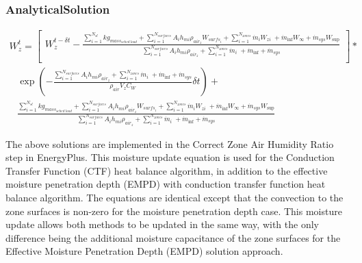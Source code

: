 \subsubsection{AnalyticalSolution}\label{analyticalsolution-1-001}

\begin{equation}
\begin{array}{l}W_z^t = \left[ \begin{array}{l}W_z^{t - \delta t} - \frac{{\sum\limits_{i = 1}^{{N_{sl}}} {k{g_{mas{s_{sched\;load}}}}}  + \sum\limits_{i = 1}^{{N_{surfaces}}} {{A_i}{h_{mi}}} {\rho_{ai{r_z}}}{W_{surf{s_i}}} + \sum\limits_{i = 1}^{{N_{zones}}} {{{\dot m}_i}} {W_{zi}}\; + {{\dot m}_{\inf }}{W_\infty } + {{\dot m}_{sys}}{W_{\sup }}}}{{\sum\limits_{i = 1}^{{N_{surfaces}}} {{A_i}{h_{mi}}} {\rho_{ai{r_z}}} + \sum\limits_{i = 1}^{{N_{zones}}} {{{\dot m}_i}} \; + {{\dot m}_{\inf }} + {{\dot m}_{sys}}}}\\\end{array} \right]*\\\;\;\;\exp \left( { - \frac{{\sum\limits_{i = 1}^{{N_{surfaces}}} {{A_i}{h_{mi}}} {\rho_{ai{r_z}}} + \sum\limits_{i = 1}^{{N_{zones}}} {{{\dot m}_i}} \; + {{\dot m}_{\inf }} + {{\dot m}_{sys}}}}{{{\rho_{air}}{V_z}{C_W}}}\delta t} \right) + \\\;\;\;\frac{{\sum\limits_{i = 1}^{{N_{sl}}} {k{g_{mas{s_{sched\;load}}}}}  + \sum\limits_{i = 1}^{{N_{surfaces}}} {{A_i}{h_{mi}}} {\rho_{ai{r_z}}}{W_{surf{s_i}}} + \sum\limits_{i = 1}^{{N_{zones}}} {{{\dot m}_i}} {W_{zi}}\; + {{\dot m}_{\inf }}{W_\infty } + {{\dot m}_{sys}}{W_{\sup }}}}{{\sum\limits_{i = 1}^{{N_{surfaces}}} {{A_i}{h_{mi}}} {\rho_{ai{r_z}}} + \sum\limits_{i = 1}^{{N_{zones}}} {{{\dot m}_i}} \; + {{\dot m}_{\inf }} + {{\dot m}_{sys}}}}\end{array}
\end{equation}

The above solutions are implemented in the Correct Zone Air Humidity Ratio step in EnergyPlus. This moisture update equation is used for the Conduction Transfer Function (CTF) heat balance algorithm, in addition to the effective moisture penetration depth (EMPD) with conduction transfer function heat balance algorithm. The equations are identical except that the convection to the zone surfaces is non-zero for the moisture penetration depth case. This moisture update allows both methods to be updated in the same way, with the only difference being the additional moisture capacitance of the zone surfaces for the Effective Moisture Penetration Depth (EMPD) solution approach.


